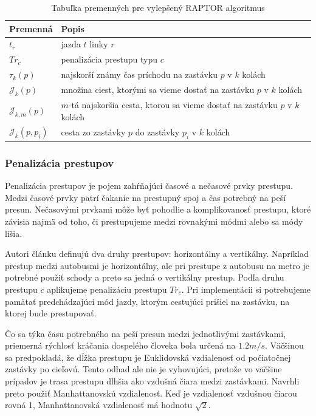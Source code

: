 \begin{table}[H]
\begin{tabular}{|l|l|}
\hline
\rowcolor[HTML]{C0C0C0} 
\textbf{Premenná} & \textbf{Popis} \\ \hline
$t_r$             & jazda $t$ linky $r$          \\ \hline
$Tr_c$             & penalizácia prestupu typu $c$          \\ \hline
$\tau_k(p)$			& najskorší známy čas príchodu na zastávku $p$ v $k$ kolách \\ \hline
$\mathcal{J}_k(p)$ & množina ciest, ktorými sa vieme dostať na zastávku $p$ v $k$ kolách \\ \hline
$\mathcal{J}_{k,m}(p)$ & $m$-tá najskoršia cesta, ktorou sa vieme dostať na zastávku $p$ v $k$ kolách \\ \hline
$\mathcal{J}_k(p, p_i)$ & cesta zo zastávky $p$ do zastávky $p_i$ v $k$ kolách \\ \hline
\end{tabular}
\caption{Tabuľka premenných pre vylepšený RAPTOR algoritmus}
\label{table:raptor-variables}
\end{table}

\subsubsection{Penalizácia prestupov}
Penalizácia prestupov je pojem zahŕňajúci časové a nečasové prvky prestupu. Medzi časové prvky patrí čakanie na prestupný spoj a čas potrebný na peší presun. Nečasovými prvkami môže byť pohodlie a komplikovanosť prestupu, ktoré závisia najmä od toho, či prestupujeme medzi rovnakými módmi alebo sa módy líšia. 

Autori článku definujú dva druhy prestupov: horizontálny a vertikálny. Napríklad prestup medzi autobusmi je horizontálny, ale pri prestupe z autobusu na metro je potrebné použiť schody a preto sa jedná o vertikálny prestup. Podľa druhu prestupu $c$ aplikujeme penalizáciu prestupu $Tr_c$. Pri implementácii si potrebujeme pamätať predchádzajúci mód jazdy, ktorým cestujúci prišiel na zastávku, na ktorej bude prestupovať.

Čo sa týka času potrebného na peší presun medzi jednotlivými zastávkami, priemerná rýchlosť kráčania dospelého človeka bola určená na $1.2 m/s$. Väčšinou sa predpokladá, že dĺžka prestupu je Euklidovská vzdialenosť od počiatočnej zastávky po cieľovú. Tento odhad ale nie je vyhovujúci, pretože vo väčšine prípadov je trasa prestupu dlhšia ako vzdušná čiara medzi zastávkami. Navrhli preto použiť Manhattanovskú vzdialenosť. Keď je vzdialenosť vzdušnou čiarou rovná 1, Manhattanovská vzdialenosť má hodnotu $\sqrt{2}$.

